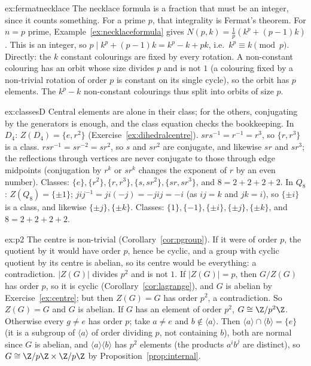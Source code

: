 \begin{solution}{ex:fermatnecklace}
\idea The necklace formula is a fraction that must be an integer, since it counts something. For a prime $p$, that integrality is Fermat's theorem.
\writeup For $n=p$ prime, Example~\ref{ex:necklaceformula} gives $N(p,k)=\frac1p\left(k^p+(p-1)k\right)$. This is an integer, so $p\mid k^p+(p-1)k=k^p-k+pk$, i.e.\ $k^p\equiv k\pmod p$.
Directly: the $k$ constant colourings are fixed by every rotation. A non-constant colouring has an orbit whose size divides $p$ and is not $1$ (a colouring fixed by a non-trivial rotation of order $p$ is constant on its single cycle), so the orbit has $p$ elements. The $k^p-k$ non-constant colourings thus split into orbits of size $p$.
\end{solution}

\begin{solution}{ex:classesD}
\idea Central elements are alone in their class; for the others, conjugating by the generators is enough, and the class equation checks the bookkeeping.
\writeup In $D_4$: $Z(D_4)=\{e,r^2\}$ (Exercise~\ref{ex:dihedralcentre}). $srs^{-1}=r^{-1}=r^3$, so $\{r,r^3\}$ is a class. $rsr^{-1}=sr^{-2}=sr^2$, so $s$ and $sr^2$ are conjugate, and likewise $sr$ and $sr^3$; the reflections through vertices are never conjugate to those through edge midpoints (conjugation by $r^k$ or $sr^k$ changes the exponent of $r$ by an even number). Classes: $\{e\},\{r^2\},\{r,r^3\},\{s,sr^2\},\{sr,sr^3\}$, and $8=2+2+2+2$.
In $Q_8$: $Z(Q_8)=\{\pm1\}$; $jij^{-1}=ji(-j)=-jij=-i$ (as $ij=k$ and $jk=i$), so $\{\pm i\}$ is a class, and likewise $\{\pm j\},\{\pm k\}$. Classes: $\{1\},\{-1\},\{\pm i\},\{\pm j\},\{\pm k\}$, and $8=2+2+2+2$.
\end{solution}

\begin{solution}{ex:p2}
\idea The centre is non-trivial (Corollary~\ref{cor:pgroup}). If it were of order $p$, the quotient by it would have order $p$, hence be cyclic, and a group with cyclic quotient by its centre is abelian, so its centre would be everything: a contradiction.
\writeup $|Z(G)|$ divides $p^2$ and is not $1$. If $|Z(G)|=p$, then $G/Z(G)$ has order $p$, so it is cyclic (Corollary~\ref{cor:lagrange}), and $G$ is abelian by Exercise~\ref{ex:centre}; but then $Z(G)=G$ has order $p^2$, a contradiction. So $Z(G)=G$ and $G$ is abelian. If $G$ has an element of order $p^2$, $G\cong\Z/p^2\Z$. Otherwise every $g\ne e$ has order $p$; take $a\ne e$ and $b\notin\langle a\rangle$. Then $\langle a\rangle\cap\langle b\rangle=\{e\}$ (it is a subgroup of $\langle a\rangle$ of order dividing $p$, not containing $b$), both are normal since $G$ is abelian, and $\langle a\rangle\langle b\rangle$ has $p^2$ elements (the products $a^ib^j$ are distinct), so $G\cong\Z/p\Z\times\Z/p\Z$ by Proposition~\ref{prop:internal}.
\end{solution}


